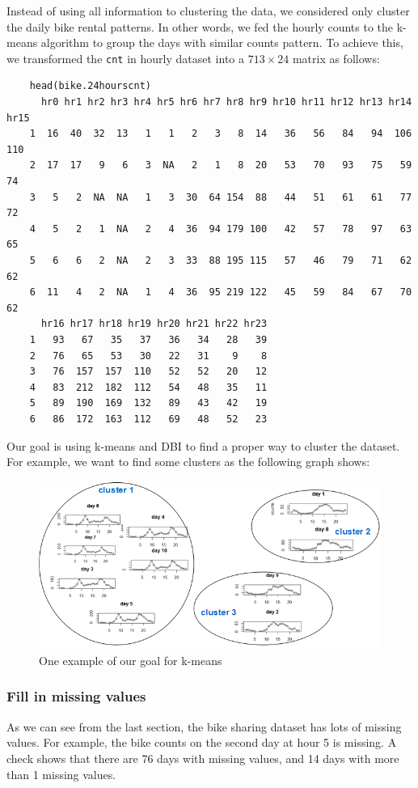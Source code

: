 \documentclass[12pt]{article}
\begin{document}
	Instead of using all information to clustering the data, we considered only cluster the daily bike rental patterns. In other words, we fed the hourly counts to the k-means algorithm to group the days with similar counts pattern. To achieve this, we transformed the \texttt{cnt} in hourly dataset into a $713 \times 24$ matrix as follows: \color{blue}
	\begin{verbatim} 
	head(bike.24hourscnt)
 	  hr0 hr1 hr2 hr3 hr4 hr5 hr6 hr7 hr8 hr9 hr10 hr11 hr12 hr13 hr14 hr15
	1  16  40  32  13   1   1   2   3   8  14   36   56   84   94  106  110
	2  17  17   9   6   3  NA   2   1   8  20   53   70   93   75   59   74
	3   5   2  NA  NA   1   3  30  64 154  88   44   51   61   61   77   72
	4   5   2   1  NA   2   4  36  94 179 100   42   57   78   97   63   65
	5   6   6   2  NA   2   3  33  88 195 115   57   46   79   71   62   62
	6  11   4   2  NA   1   4  36  95 219 122   45   59   84   67   70   62
	  hr16 hr17 hr18 hr19 hr20 hr21 hr22 hr23
	1   93   67   35   37   36   34   28   39
	2   76   65   53   30   22   31    9    8
	3   76  157  157  110   52   52   20   12
	4   83  212  182  112   54   48   35   11
	5   89  190  169  132   89   43   42   19
	6   86  172  163  112   69   48   52   23
	\end{verbatim} \color{black}
	Our goal is using k-means and DBI to find a proper way to cluster the dataset. For example, we want to find some clusters as the following graph shows:
	\begin{figure}[H]
		\centering
		\includegraphics[scale=.8]{figures/cluster_goal.png}
		\caption{One example of our goal for k-means}
	\end{figure}
	
	
	\subsubsection{Fill in missing values}
	As we can see from the last section, the bike sharing dataset has lots of missing values. For example, the bike counts on the second day at hour 5 is missing. A check shows that there are 76 days with missing values, and 14 days with more than 1 missing values. 
	
\end{document}
